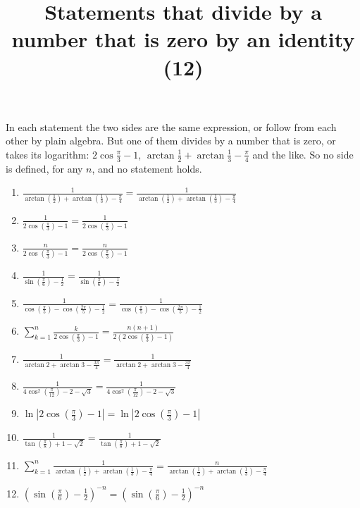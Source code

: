 \documentclass[11pt,a4paper]{article}
\title{Statements that divide by a number that is zero by an identity (12)}
\author{}
\date{}
\begin{document}
\maketitle
In each statement the two sides are the same expression, or follow from each other by plain algebra. But one of them divides by a number that is zero, or takes its logarithm: $2\cos\frac{\pi}{3} - 1$, $\arctan\frac{1}{2} + \arctan\frac{1}{3} - \frac{\pi}{4}$ and the like. So no side is defined, for any $n$, and no statement holds.

\begin{enumerate}
\item $\displaystyle \frac{1}{\arctan\left(\frac{1}{2}\right) + \arctan\left(\frac{1}{3}\right) - \frac{\pi}{4}} = \frac{1}{\arctan\left(\frac{1}{2}\right) + \arctan\left(\frac{1}{3}\right) - \frac{\pi}{4}}$
\item $\displaystyle \frac{1}{2\cos\left(\frac{\pi}{3}\right) - 1} = \frac{1}{2\cos\left(\frac{\pi}{3}\right) - 1}$
\item $\displaystyle \frac{n}{2\cos\left(\frac{\pi}{3}\right) - 1} = \frac{n}{2\cos\left(\frac{\pi}{3}\right) - 1}$
\item $\displaystyle \frac{1}{\sin\left(\frac{\pi}{6}\right) - \frac{1}{2}} = \frac{1}{\sin\left(\frac{\pi}{6}\right) - \frac{1}{2}}$
\item $\displaystyle \frac{1}{\cos\left(\frac{\pi}{5}\right) - \cos\left(\frac{2\pi}{5}\right) - \frac{1}{2}} = \frac{1}{\cos\left(\frac{\pi}{5}\right) - \cos\left(\frac{2\pi}{5}\right) - \frac{1}{2}}$
\item $\displaystyle \sum_{k=1}^{n} \frac{k}{2\cos\left(\frac{\pi}{3}\right) - 1} = \frac{n\left(n + 1\right)}{2\left(2\cos\left(\frac{\pi}{3}\right) - 1\right)}$
\item $\displaystyle \frac{1}{\arctan 2 + \arctan 3 - \frac{3\pi}{4}} = \frac{1}{\arctan 2 + \arctan 3 - \frac{3\pi}{4}}$
\item $\displaystyle \frac{1}{4\cos^{2}\left(\frac{\pi}{12}\right) - 2 - \sqrt{3}} = \frac{1}{4\cos^{2}\left(\frac{\pi}{12}\right) - 2 - \sqrt{3}}$
\item $\displaystyle \ln\left|2\cos\left(\frac{\pi}{3}\right) - 1\right| = \ln\left|2\cos\left(\frac{\pi}{3}\right) - 1\right|$
\item $\displaystyle \frac{1}{\tan\left(\frac{\pi}{8}\right) + 1 - \sqrt{2}} = \frac{1}{\tan\left(\frac{\pi}{8}\right) + 1 - \sqrt{2}}$
\item $\displaystyle \sum_{k=1}^{n} \frac{1}{\arctan\left(\frac{1}{2}\right) + \arctan\left(\frac{1}{3}\right) - \frac{\pi}{4}} = \frac{n}{\arctan\left(\frac{1}{2}\right) + \arctan\left(\frac{1}{3}\right) - \frac{\pi}{4}}$
\item $\displaystyle \left(\sin\left(\frac{\pi}{6}\right) - \frac{1}{2}\right)^{-n} = \left(\sin\left(\frac{\pi}{6}\right) - \frac{1}{2}\right)^{-n}$
\end{enumerate}
\end{document}
